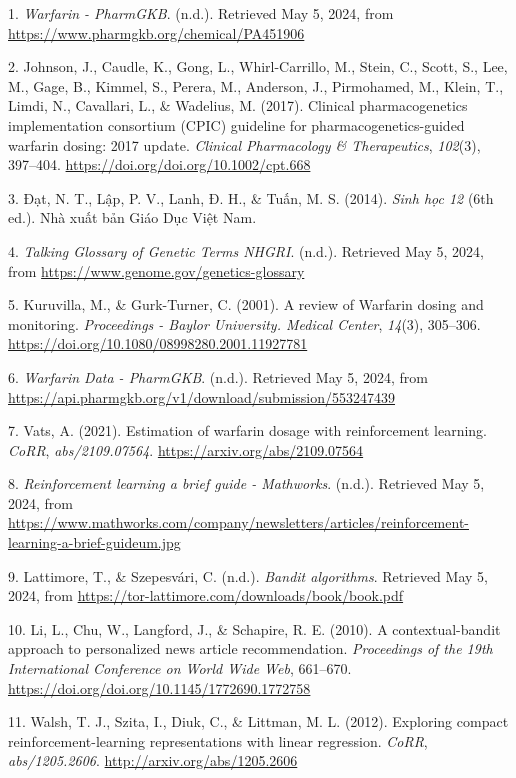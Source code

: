 \documentclass[14pt,oneside]{scrbook}
\newlength{\cslhangindent}
\newenvironment{CSLReferences}[2] %
{\begin{list}{}{%
\setlength{\itemindent}{\smallskipamount}
\setlength{\leftmargin}{0pt}
\setlength{\parsep}{\smallskipamount}
\ifodd #1
\setlength{\leftmargin}{\cslhangindent}
\setlength{\itemindent}{-1\cslhangindent}
\fi
\setlength{\itemsep}{#2\baselineskip}}}
{\end{list}}
\begin{document}
\label{refs}
\begin{CSLReferences}{1}{0}
1. \emph{{Warfarin - PharmGKB}}. (n.d.). Retrieved May 5, 2024, from
\url{https://www.pharmgkb.org/chemical/PA451906}

2. Johnson, J., Caudle, K., Gong, L., Whirl-Carrillo, M., Stein, C.,
Scott, S., Lee, M., Gage, B., Kimmel, S., Perera, M., Anderson, J.,
Pirmohamed, M., Klein, T., Limdi, N., Cavallari, L., \& Wadelius, M.
(2017). Clinical pharmacogenetics implementation consortium (CPIC)
guideline for pharmacogenetics-guided warfarin dosing: 2017 update.
\emph{Clinical Pharmacology \& Therapeutics}, \emph{102}(3), 397--404.
\url{https://doi.org/doi.org/10.1002/cpt.668}

3. Đạt, N. T., Lập, P. V., Lanh, Đ. H., \& Tuấn, M. S. (2014).
\emph{Sinh học 12} (6th ed.). Nhà xuất bản Giáo Dục Việt Nam.

4. \emph{{Talking Glossary of Genetic Terms \textbar{} NHGRI}}. (n.d.).
Retrieved May 5, 2024, from
\url{https://www.genome.gov/genetics-glossary}

5. Kuruvilla, M., \& Gurk-Turner, C. (2001). {A review of Warfarin
dosing and monitoring}. \emph{Proceedings - Baylor University. Medical
Center}, \emph{14}(3), 305--306.
\url{https://doi.org/10.1080/08998280.2001.11927781}

6. \emph{{Warfarin Data - PharmGKB}}. (n.d.). Retrieved May 5, 2024,
from \url{https://api.pharmgkb.org/v1/download/submission/553247439}

7. Vats, A. (2021). Estimation of warfarin dosage with reinforcement
learning. \emph{CoRR}, \emph{abs/2109.07564}.
\url{https://arxiv.org/abs/2109.07564}

8. \emph{{Reinforcement learning a brief guide - Mathworks}}. (n.d.).
Retrieved May 5, 2024, from
\url{https://www.mathworks.com/company/newsletters/articles/reinforcement-learning-a-brief-guideum.jpg}

9. Lattimore, T., \& Szepesvári, C. (n.d.). \emph{Bandit algorithms}.
Retrieved May 5, 2024, from
\url{https://tor-lattimore.com/downloads/book/book.pdf}

10. Li, L., Chu, W., Langford, J., \& Schapire, R. E. (2010). A
contextual-bandit approach to personalized news article recommendation.
\emph{Proceedings of the 19th International Conference on World Wide
Web}, 661--670. \url{https://doi.org/doi.org/10.1145/1772690.1772758}

11. Walsh, T. J., Szita, I., Diuk, C., \& Littman, M. L. (2012).
Exploring compact reinforcement-learning representations with linear
regression. \emph{CoRR}, \emph{abs/1205.2606}.
\url{http://arxiv.org/abs/1205.2606}

\end{CSLReferences}
\backmatter
\end{document}
